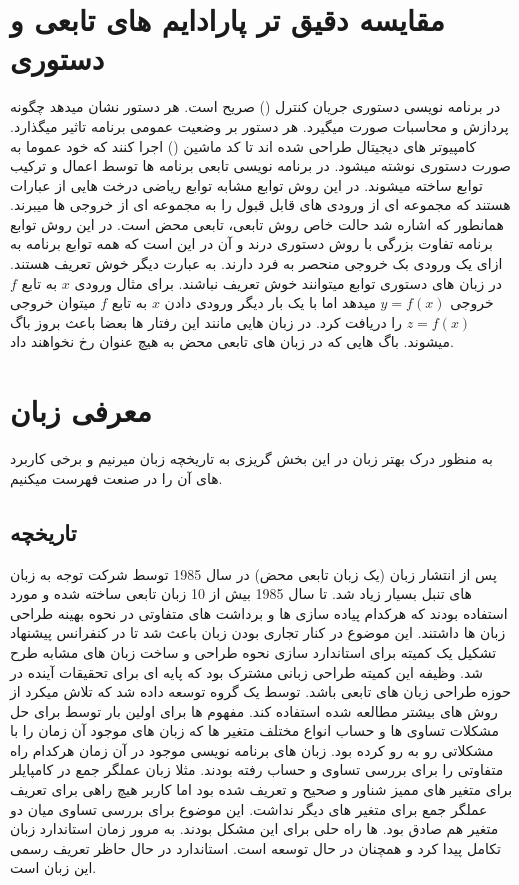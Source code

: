 \section{
مقایسه دقیق تر پارادایم های تابعی و دستوری
}
در برنامه نویسی دستوری جریان کنترل
()
صریح است. هر دستور نشان میدهد چگونه پردازش و محاسبات صورت میگیرد. هر دستور بر وضعیت عمومی برنامه تاثیر میگذارد. کامپیوتر های دیجیتال طراحی شده اند تا کد ماشین 
()
اجرا کنند که خود عموما به صورت دستوری نوشته میشود. 
\newline
در برنامه نویسی تابعی برنامه ها توسط اعمال و ترکیب توابع ساخته میشوند. در این روش توابع مشابه توابع ریاضی درخت هایی از عبارات هستند که مجموعه ای از ورودی های قابل قبول را به مجموعه ای از خروجی ها میبرند.  همانطور که اشاره شد حالت خاص روش تابعی، تابعی محض است. در این روش توابع برنامه تفاوت بزرگی با روش دستوری درند و آن در این است که همه توابع برنامه به ازای یک ورودی بک خروجی منحصر به فرد دارند. به عبارت دیگر خوش تعریف هستند. در زبان های دستوری توابع میتوانند خوش تعریف نباشند. برای مثال ورودی
$x$
به تابع 
$f$
 خروجی
$y=f(x)$
میدهد اما با یک بار دیگر ورودی دادن 
$x$
به تابع 
$f$
میتوان خروجی 
$z=f(x)$
را دریافت کرد. در زبان هایی مانند 
این رفتار ها بعضا باعث بروز باگ میشوند. باگ هایی که در زبان های تابعی محض به هیچ عنوان رخ نخواهند داد.

\section{
معرفی زبان 
}
به منظور درک بهتر زبان در این بخش گریزی به تاریخچه زبان 
میرنیم  و برخی کاربرد های آن را در صنعت فهرست میکنیم. 
\subsection{
تاریخچه
}
پس از انتشار زبان 
(یک زبان تابعی محض) در سال 1985 توسط شرکت 
توجه به زبان های تنبل بسیار زیاد شد. تا سال 1985 بیش از 10 زبان تابعی ساخته شده و مورد استفاده بودند که هرکدام پیاده سازی ها و برداشت های متفاوتی در نحوه بهینه طراحی زبان ها داشتند. این موضوع در کنار تجاری بودن زبان 
باعث شد تا در کنفرانس 
پیشنهاد تشکیل یک کمیته برای استاندارد سازی نحوه طراحی و ساخت زبان های مشابه طرح شد. وظیفه این کمیته طراحی زبانی مشترک بود که پایه ای برای تحقیقات آینده در حوزه طراحی زبان های تابعی باشد. 
\newline
{}
توسط یک گروه توسعه داده شد که تلاش میکرد از روش های بیشتر مطالعه شده استفاده کند. مفهوم 
ها برای اولین بار توسط 
برای حل مشکلات تساوی ها و حساب انواع مختلف متغیر ها که زبان های موجود آن زمان را با مشکلاتی رو به رو کرده بود. زبان های برنامه نویسی موجود در آن زمان هرکدام راه متفاوتی را برای بررسی تساوی و حساب رفته بودند. مثلا زبان 
عملگر جمع در کامپایلر برای متغیر های ممیز شناور و صحیح 
و 
تعریف شده بود اما کاربر هیچ راهی برای تعریف عملگر جمع برای متغیر های دیگر نداشت. این موضوع برای بررسی تساوی میان دو متغیر هم صادق بود. 
ها راه حلی برای این مشکل بودند. به مرور زمان استاندارد زبان 
تکامل پیدا کرد و همچنان در حال توسعه است. استاندارد 
در حال حاظر تعریف رسمی این زبان است. 
